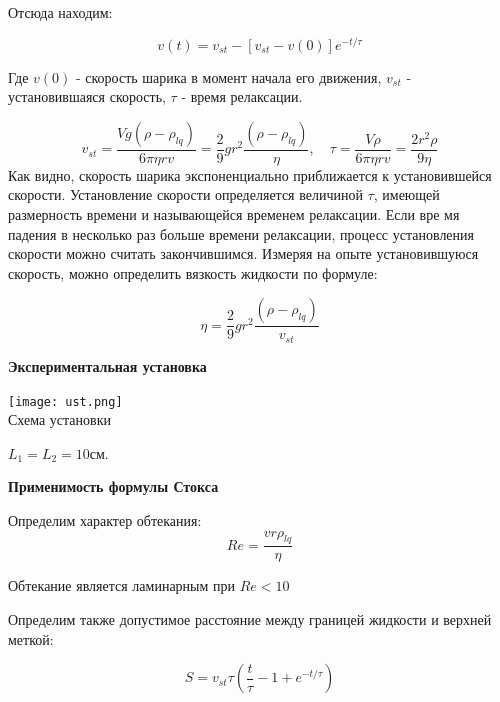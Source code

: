 \documentclass[10pt]{article}
\begin{document}
Отсюда находим:

\begin{equation}
    v(t) = v_{st} - [v_{st} - v(0)] e^{-t/ \tau}
\end{equation}

Где $v(0)$ - скорость шарика в момент начала его движения, $v_{st}$ - установившаяся скорость, $\tau$ - время релаксации.

\begin{equation}
    v_{st} = \frac{V g (\rho - \rho_{lq} )}{6 \pi \eta r v}
    = \frac{2}{9} g r^2 \frac{(\rho - \rho_{lq} )}{\eta}, 
    \quad 
    \tau = \frac{V \rho}{6 \pi \eta r v} = \frac{2 r^2 \rho}{9 \eta}
\end{equation}
{\small
Как видно, скорость шарика экспоненциально приближается к установившейся скорости. Установление скорости определяется величиной $\tau$, имеющей размерность времени и называющейся временем релаксации. Если вре
мя падения в несколько раз больше времени релаксации, процесс установления скорости можно считать закончившимся.
}
Измеряя на опыте установившуюся скорость, можно определить вязкость жидкости по формуле:

\begin{equation}
    \eta = \frac{2}{9} g r^2 \frac{(\rho - \rho_{lq} )}{v_{st}}
\end{equation}

\newpage
\textbf{Экспериментальная установка}

    \begin{center}
    \texttt{[image: ust.png]} \\Схема установки
    \end{center}

$L_1 = L_2 = 10$см.

\textbf{Применимость формулы Стокса}

Определим характер обтекания:
\begin{equation}
    Re = \frac{vr \rho_{lq}}{\eta}
\end{equation}

Обтекание является ламинарным при $Re < 10$

Определим также допустимое расстояние между границей жидкости и верхней меткой:

\begin{equation}
    S = v_{st} \tau (\frac{t}{\tau} - 1 + e^{-t/\tau})
\end{equation}
\end{document}
